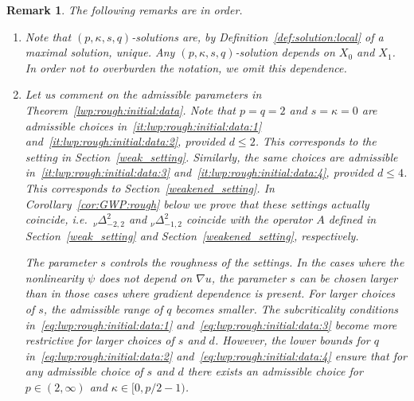 \documentclass[reqno]{amsart}
\newtheorem{remark}[Satz]{Remark}
\newcommand{\1}{\mathbf{1}}
\begin{document}
    \begin{remark} The following remarks are in order. 
        \begin{enumerate}
            \item Note that $(p,\kappa,s,q)$-solutions are, by Definition~\ref{def:solution:local} of a maximal solution, unique. Any $(p,\kappa,s,q)$-solution depends on $X_0$ and $X_1$. In order not to overburden the notation, we omit this dependence. 
            \item Let us comment on the admissible parameters in Theorem~\ref{lwp:rough:initial:data}. Note that $p=q=2$ and $s=\kappa=0$ are admissible choices in~\ref{it:lwp:rough:initial:data:1} and~\ref{it:lwp:rough:initial:data:2}, provided $d\le 2$. This corresponds to the setting in Section~\ref{weak_setting}. Similarly, the same choices are admissible in~\ref{it:lwp:rough:initial:data:3} and~\ref{it:lwp:rough:initial:data:4}, provided $d\le 4$. This corresponds to Section~\ref{weakened_setting}. 
            In Corollary~\ref{cor:GWP:rough} below we prove that these settings actually coincide, i.e.\ $_\nu\Delta_{-2,2}^2$ and $_\nu\Delta_{-1,2}^2$ coincide with the operator $A$ defined in Section~\ref{weak_setting} and Section~\ref{weakened_setting}, respectively. 

            The parameter $s$ controls the roughness of the settings. In the cases where the nonlinearity $\psi$ does not depend on $\nabla u$, the parameter $s$ can be chosen larger than in those cases where gradient dependence is present. For larger choices of $s$, the admissible range of $q$ becomes smaller. The subcriticality conditions in~\eqref{eq:lwp:rough:initial:data:1} and~\eqref{eq:lwp:rough:initial:data:3} become more restrictive for larger choices of $s$ and $d$. However, the lower bounds for $q$ in~\eqref{eq:lwp:rough:initial:data:2} and~\eqref{eq:lwp:rough:initial:data:4} ensure that for any  admissible choice of $s$ and $d$  there exists an admissible choice for $p\in (2,\infty)$ and $\kappa \in[0,p/2-1)$. 
        \end{enumerate}
    \end{remark}
\end{document}
